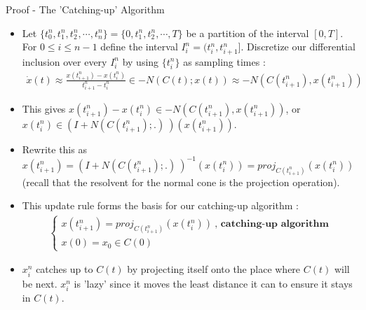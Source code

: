 \documentclass[8pt,aspectratio=169]{beamer}
\begin{document}
\begin{frame}{Proof - The 'Catching-up' Algorithm}
    \begin{itemize}[<+->]
        \item Let $\{t_0^n, t_1^n, t_2^n, \cdots, t_n^n\} = \{0, t_1^n, t_2^n, \cdots, T\}$ be a partition of the interval $[0, T]$. For $0 \leq i \leq n-1$ define the interval $I_i^n = (t_i^n, t_{i+1}^n]$. Discretize our differential inclusion over every $I_i^n$ by using $\{t_i^n\}$ as sampling times : 
            \begin{align*}
                \dot{x}(t) \approx \frac{x(t_{i+1}^n) - x(t_i^n)}{t_{i+1}^n - t_i^n} \in -N(C(t); x(t)) \approx -N\left (C(t_{i+1}^n), x(t_{i+1}^n)\right )
            \end{align*}
        \item This gives $x(t_{i+1}^n) - x(t_i^n) \in -N(C(t_{i+1}^n), x(t_{i+1}^n))$, or $x(t_i^n) \in (I+ N(C(t_{i+1}^n); .)\ )(x(t_{i+1}^n))$. 
        \item Rewrite this as $x(t_{i+1}^n) = (I+ N(C(t_{i+1}^n); .)\ )^{-1}(x(t_i^n)) = proj_{C(t_{i+1}^n)}(x(t_i^n))$ (recall that the resolvent for the normal cone is the projection operation).
        \item This update rule forms the basis for our catching-up algorithm :
            \begin{align*}
                \begin{cases}
                    x(t_{i+1}^n) = proj_{C(t_{i+1}^n)}(x(t_i^n)) \ \textbf{, catching-up algorithm}\\
                    x(0) = x_0 \in C(0)
                \end{cases}
            \end{align*}
        \item $x_i^n$ catches up to $C(t)$ by projecting itself onto the place where $C(t)$ will be next. $x_i^n$ is 'lazy' since it moves the least distance it can to ensure it stays in $C(t)$. 
    \end{itemize}
\end{frame}
\end{document}
